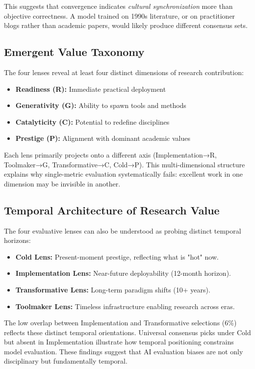 \documentclass{article}
\begin{document}
This suggests that convergence indicates \textit{cultural synchronization} more than objective correctness. A model trained on 1990s literature, or on practitioner blogs rather than academic papers, would likely produce different consensus sets.

\subsection{Emergent Value Taxonomy}

The four lenses reveal at least four distinct dimensions of research contribution:

\begin{itemize}
    \item \textbf{Readiness (R):} Immediate practical deployment
    \item \textbf{Generativity (G):} Ability to spawn tools and methods
    \item \textbf{Catalyticity (C):} Potential to redefine disciplines
    \item \textbf{Prestige (P):} Alignment with dominant academic values
\end{itemize}

Each lens primarily projects onto a different axis (Implementation→R, Toolmaker→G, Transformative→C, Cold→P). This multi-dimensional structure explains why single-metric evaluation systematically fails: excellent work in one dimension may be invisible in another.

\subsection{Temporal Architecture of Research Value}

The four evaluative lenses can also be understood as probing distinct temporal horizons:

\begin{itemize}
    \item \textbf{Cold Lens:} Present-moment prestige, reflecting what is "hot" now.
    \item \textbf{Implementation Lens:} Near-future deployability (12-month horizon).
    \item \textbf{Transformative Lens:} Long-term paradigm shifts (10+ years).
    \item \textbf{Toolmaker Lens:} Timeless infrastructure enabling research across eras.
\end{itemize}

The low overlap between Implementation and Transformative selections (6\%) reflects these distinct temporal orientations. Universal consensus picks under Cold but absent in Implementation illustrate how temporal positioning constrains model evaluation. These findings suggest that AI evaluation biases are not only disciplinary but fundamentally temporal.
\end{document}
